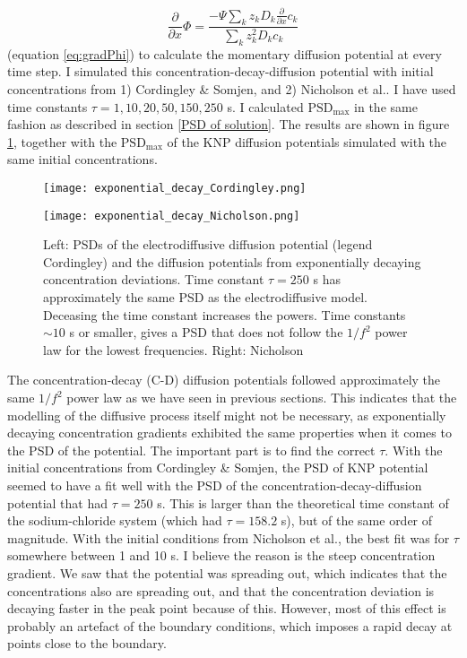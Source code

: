 \documentclass{article}
\begin{document}
\begin{equation*}
\frac{\partial}{\partial x} \Phi = \frac{-\Psi \sum_k z_k D_k \frac{\partial}{\partial x} c_k}{\sum_k z_k^2 D_k c_k}
\end{equation*}
(equation \ref{eq:gradPhi}) to calculate the momentary diffusion potential at every time step. I simulated this concentration-decay-diffusion potential with initial concentrations from 1) Cordingley \& Somjen, and 2) Nicholson et al.. I have used time constants $\tau = 1,10,20,50, 150, 250$ s. I calculated $\text{PSD}_{\text{max}}$ in the same fashion as described in section \ref{PSD of solution}. The results are shown in figure \ref{fig:exponential_decay}, together with the $\text{PSD}_{\text{max}}$ of the KNP diffusion potentials simulated with the same initial concentrations. 

\begin{figure}
 
   \begin{minipage}[b]{0.45\textwidth}
    \texttt{[image: exponential\_decay\_Cordingley.png]}
  \end{minipage}
     \begin{minipage}[b]{0.45\textwidth}
    \texttt{[image: exponential\_decay\_Nicholson.png]}
  \end{minipage}
  \caption{Left: PSDs of the electrodiffusive diffusion potential (legend Cordingley) and the diffusion potentials from exponentially decaying concentration deviations. Time constant $\tau = 250$ s has approximately the same PSD as the electrodiffusive model. Deceasing the time constant increases the powers. Time constants $\sim 10$ s or smaller, gives a PSD that does not follow the $1/f^2$ power law for the lowest frequencies. Right: Nicholson}
  \label{fig:exponential_decay}
\end{figure}

The concentration-decay (C-D) diffusion potentials followed approximately the same $1/f^2$ power law as we have seen in previous sections. This indicates that the modelling of the diffusive process itself might not be necessary, as exponentially decaying concentration gradients exhibited the same properties when it comes to the PSD of the potential. The important part is to find the correct $\tau$. With the initial concentrations from Cordingley \& Somjen, the PSD of KNP potential seemed to have a fit well with the PSD of the concentration-decay-diffusion potential that had $\tau=250$ s. This is larger than the theoretical time constant of the sodium-chloride system (which had $\tau = 158.2$ s), but of the same order of magnitude. With the initial conditions from Nicholson et al., the best fit was for $\tau$ somewhere between 1 and 10 s. I believe the reason is the steep concentration gradient. We saw that the potential was spreading out, which indicates that the concentrations also are spreading out, and that the concentration deviation is decaying faster in the peak point because of this. However, most of this effect is probably an artefact of the boundary conditions, which imposes a rapid decay at points close to the boundary.
\end{document}
